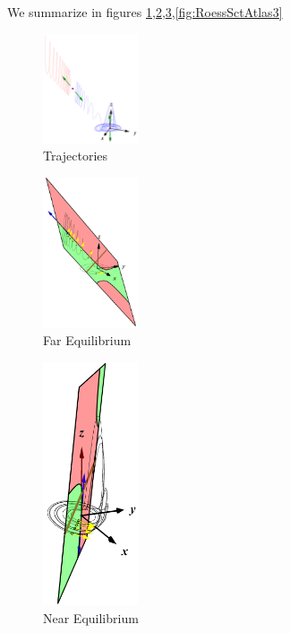 \documentclass{article}
\begin{document}
We summarize in figures
\ref{fig:RoessTrjs2},\ref{fig:RoessFarEq3},\ref{fig:RoessNearEq3},\ref{fig:RoessSctAtlas3}

\begin{figure}
\centering
\includegraphics[width=0.25\textwidth]{RoessTrjs2.png}
\caption{Trajectories}
\label{fig:RoessTrjs2}
\end{figure}

\begin{figure}
\centering
\includegraphics[width=0.25\textwidth]{RoessFarEq3.png}
\caption{Far Equilibrium}
\label{fig:RoessFarEq3}
\end{figure}

\begin{figure}
\centering
\includegraphics[width=0.25\textwidth]{RoessNearEq3.png}
\caption{Near Equilibrium}
\label{fig:RoessNearEq3}
\end{figure}
\end{document}
